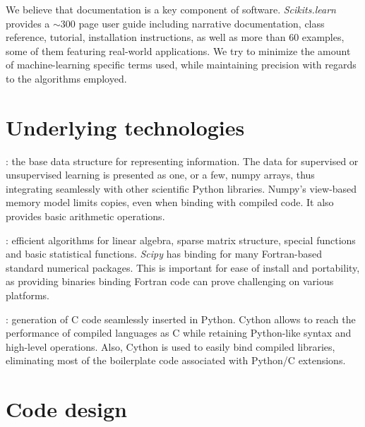 \documentclass[twoside,11pt]{article}
\begin{document}
\smallskip {}
%
We believe that documentation is a key component of software.
\emph{Scikits.learn} provides a $\sim$300 page user guide including
narrative documentation, class reference, tutorial, installation
instructions, as well as more than 60 examples, some of them featuring
real-world applications. We try to minimize the amount of
machine-learning specific terms used, while maintaining precision with
regards to the algorithms employed.


\section{Underlying technologies}



:
%
the base data structure for representing
information. The data for supervised or unsupervised learning is
presented as one, or a few, numpy arrays, thus integrating seamlessly
with other scientific Python libraries. Numpy's view-based memory 
model limits copies, even when binding with compiled code. It also 
provides basic arithmetic operations. 

\smallskip
{}:
%
efficient algorithms for linear algebra, sparse matrix structure, special
functions and basic statistical functions. {\sl Scipy} has binding for
many Fortran-based standard numerical packages. This is important for
ease of install and portability, as providing binaries binding Fortran
code can prove challenging on various platforms. 

\smallskip
{}:
%
generation of C code seamlessly inserted in Python. Cython allows to
reach the performance of compiled languages as C while retaining
Python-like syntax and high-level operations. Also, Cython is used to
easily bind compiled libraries, eliminating most of the boilerplate code
associated with Python/C extensions.


\section{Code design}
\end{document}
